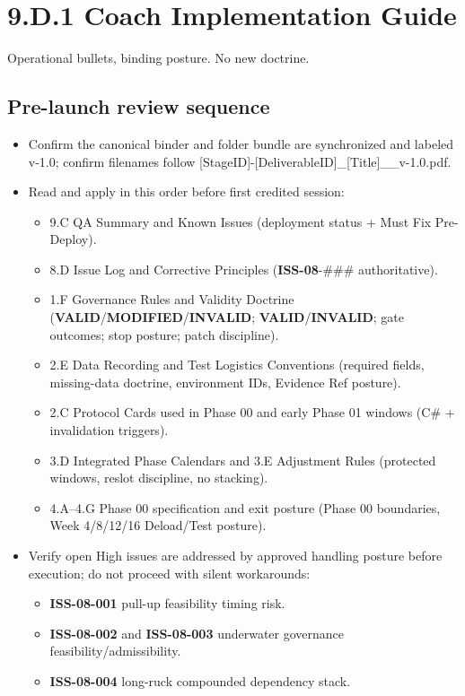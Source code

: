 \documentclass[10pt]{article}
\begin{document}
\section*{9.D.1 Coach Implementation Guide}
{}

Operational bullets, binding posture. No new doctrine.

\subsection*{Pre-launch review sequence}
{}

\begin{itemize}
\item Confirm the canonical binder and folder bundle are synchronized and labeled v-1.0; confirm filenames follow [StageID]-[DeliverableID]\_[Title]\_\_v-1.0.pdf.
\item Read and apply in this order before first credited session:
  \begin{itemize}
  \item 9.C QA Summary and Known Issues (deployment status + Must Fix Pre-Deploy).
  \item 8.D Issue Log and Corrective Principles (\textbf{ISS-08}-\#\#\# authoritative).
  \item 1.F Governance Rules and Validity Doctrine (\textbf{VALID}/\textbf{MODIFIED}/\textbf{INVALID}; \textbf{VALID}/\textbf{INVALID}; gate outcomes; stop posture; patch discipline).
  \item 2.E Data Recording and Test Logistics Conventions (required fields, missing-data doctrine, environment IDs, Evidence Ref posture).
  \item 2.C Protocol Cards used in Phase 00 and early Phase 01 windows (C\# + invalidation triggers).
  \item 3.D Integrated Phase Calendars and 3.E Adjustment Rules (protected windows, reslot discipline, no stacking).
  \item 4.A–4.G Phase 00 specification and exit posture (Phase 00 boundaries, Week 4/8/12/16 Deload/Test posture).
  \end{itemize}
\item Verify open High issues are addressed by approved handling posture before execution; do not proceed with silent workarounds:
  \begin{itemize}
  \item \textbf{ISS-08-001} pull-up feasibility timing risk.
  \item \textbf{ISS-08-002} and \textbf{ISS-08-003} underwater governance feasibility/admissibility.
  \item \textbf{ISS-08-004} long-ruck compounded dependency stack.
  \end{itemize}
\end{itemize}
\end{document}
